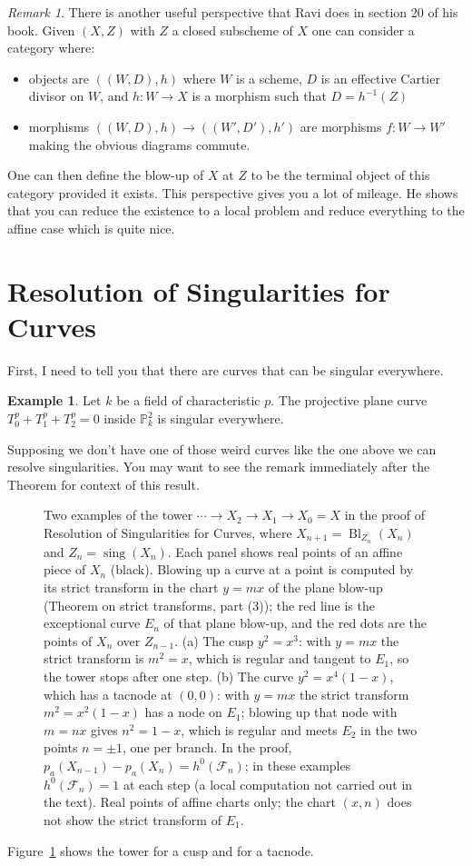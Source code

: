 \documentclass[12pt]{article}
\numberwithin{equation}{section}
\theoremstyle{definition}
\newtheorem{example}[theorem]{Example}
\theoremstyle{remark}
\newtheorem{remark}[theorem]{Remark}
\newcommand{\PP}{\mathbb{P}}
\newcommand{\Bl}{\operatorname{Bl}}
\newcommand{\Fcal}{\mathcal{F}}
\newcommand{\sing}{\operatorname{sing}}
\begin{document}
\begin{remark}
There is another useful perspective that Ravi does in section 20 of his book. 
Given $(X,Z)$ with $Z$ a closed subscheme of $X$ one can consider a category where:
\begin{itemize}
	\item objects are $((W,D),h)$ where $W$ is a scheme, $D$ is an effective Cartier divisor on $W$, and $h:W\to X$ is a morphism such that $D =h^{-1}(Z)$
	\item morphisms $((W,D),h) \to ( (W',D'),h')$ are morphisms $f:W \to W'$ making the obvious diagrams commute. 
\end{itemize}

One can then define the blow-up of $X$ at $Z$ to be the terminal object of this category provided it exists. 
This perspective gives you a lot of mileage. 
He shows that you can reduce the existence to a local problem and reduce everything to the affine case which is quite nice.
\end{remark}


\section{Resolution of Singularities for Curves}
First, I need to tell you that there are curves that can be singular everywhere. 
\begin{example}
	Let $k$ be a field of characteristic $p$.
	The projective plane curve $T_0^p+T_1^p+T_2^p=0$ inside $\PP^2_k$ is singular everywhere. 
\end{example}

Supposing we don't have one of those weird curves like the one above we can resolve singularities. 
You may want to see the remark immediately after the Theorem for context of this result.

\begin{figure}[H]
\centering

\caption{Two examples of the tower $\cdots\to X_2\to X_1\to X_0=X$ in the proof of Resolution of Singularities for Curves, where $X_{n+1}=\Bl_{Z_n}(X_n)$ and $Z_n=\sing(X_n)$. Each panel shows real points of an affine piece of $X_n$ (black). Blowing up a curve at a point is computed by its strict transform in the chart $y=mx$ of the plane blow-up (Theorem on strict transforms, part (3)); the red line is the exceptional curve $E_n$ of that plane blow-up, and the red dots are the points of $X_n$ over $Z_{n-1}$. (a) The cusp $y^2=x^3$: with $y=mx$ the strict transform is $m^2=x$, which is regular and tangent to $E_1$, so the tower stops after one step. (b) The curve $y^2=x^4(1-x)$, which has a tacnode at $(0,0)$: with $y=mx$ the strict transform $m^2=x^2(1-x)$ has a node on $E_1$; blowing up that node with $m=nx$ gives $n^2=1-x$, which is regular and meets $E_2$ in the two points $n=\pm1$, one per branch. In the proof, $p_a(X_{n-1})-p_a(X_n)=h^0(\Fcal_n)$; in these examples $h^0(\Fcal_n)=1$ at each step (a local computation not carried out in the text). Real points of affine charts only; the chart $(x,n)$ does not show the strict transform of $E_1$.}\label{fig:resolution-towers}
\end{figure}
Figure~\ref{fig:resolution-towers} shows the tower for a cusp and for a tacnode.
\end{document}
